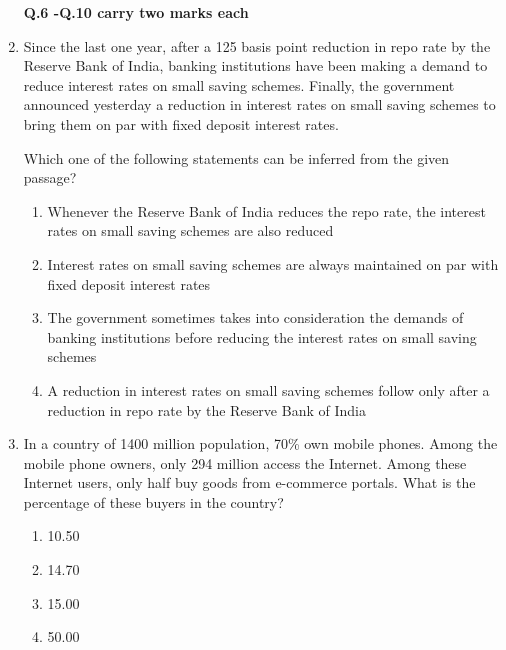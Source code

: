 \documentclass[journal,12pt,onecolumn]{IEEEtran}
\begin{document}
\begin{enumerate}[itemsep=0.5cm]
\textbf{Q.6 -Q.10 carry two marks each}

\vspace{2em}

\item Since the last one year, after a 125 basis point reduction in repo rate by the Reserve Bank of India, banking institutions have been making a demand to reduce interest rates on small saving schemes. Finally, the government announced yesterday a reduction in interest rates on small saving schemes to bring them on par with fixed deposit interest rates.

\vspace{1em}

Which one of the following statements can be inferred from the given passage?

\hfill{}


\begin{enumerate}
    \item Whenever the Reserve Bank of India reduces the repo rate, the interest rates on small saving schemes are also reduced
    \item Interest rates on small saving schemes are always maintained on par with fixed deposit interest rates
    \item The government sometimes takes into consideration the demands of banking institutions before reducing the interest rates on small saving schemes
    \item A reduction in interest rates on small saving schemes follow only after a reduction in repo rate by the Reserve Bank of India
\end{enumerate}

\vspace{2em}


\item In a country of 1400 million population, 70\% own mobile phones. Among the mobile phone owners, only 294 million access the Internet. Among these Internet users, only half buy goods from e-commerce portals. What is the percentage of these buyers in the country?

\hfill{}

\begin{multicols}{4}
\begin{enumerate}
    \item 10.50
    \item 14.70
    \item 15.00
    \item 50.00
\end{enumerate}
\end{multicols}


\end{enumerate}
\end{document}
